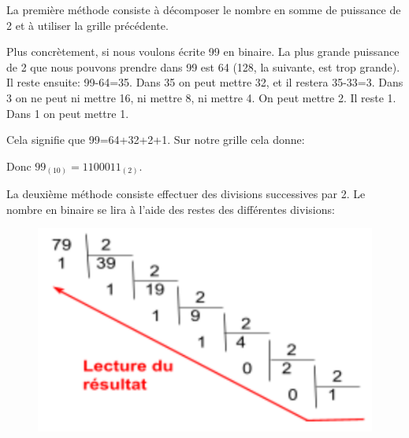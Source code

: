 \documentclass[11pt, a4paper]{book}
\begin{document}
La première méthode consiste à décomposer le nombre en somme de puissance de 2 et à utiliser la grille précédente. 

Plus concrètement, si nous voulons écrite 99 en binaire. La plus grande puissance de 2 que nous pouvons prendre dans 99 est 64 (128, la suivante, est trop grande). Il reste ensuite: 99-64=35. Dans 35 on peut mettre 32, et il restera 35-33=3. Dans 3 on ne peut ni mettre 16, ni mettre 8, ni mettre 4. On peut mettre 2. Il reste 1. Dans 1 on peut mettre 1. 

Cela signifie que 99=64+32+2+1. Sur notre grille cela donne:

\begin{center}
\end{center}

Donc $99_{(10)}=1100011_{(2)}$.


\;

La deuxième méthode consiste  effectuer des divisions successives par 2. Le nombre en binaire se lira à l'aide des restes des différentes divisions:

\begin{figure}[h]
\begin{center}
\includegraphics[scale=.5]{images/divisionbinaire}
\end{center}
\end{figure}
\end{document}
